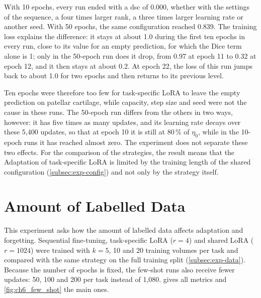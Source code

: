 With 10 epochs, every run ended with a \gls{dsc} of 0.000, whether with the settings of the sequence, a four times larger rank, a three times larger learning rate or another seed.
With 50 epochs, the same configuration reached 0.839.
The training loss explains the difference: it stays at about 1.0 during the first ten epochs in every run, close to its value for an empty prediction, for which the Dice term alone is 1; only in the 50-epoch run does it drop, from 0.97 at epoch 11 to 0.32 at epoch 12, and it then stays at about 0.2.
At epoch 22, the loss of this run jumps back to about 1.0 for two epochs and then returns to its previous level.

Ten epochs were therefore too few for task-specific LoRA to leave the empty prediction on patellar cartilage, while capacity, step size and seed were not the cause in these runs.
The 50-epoch run differs from the others in two ways, however: it has five times as many updates, and its learning rate decays over these 5{,}400 updates, so that at epoch 10 it is still at 80\,\% of $\eta_0$, while in the 10-epoch runs it has reached almost zero.
The experiment does not separate these two effects.
For the comparison of the strategies, the result means that the Adaptation of task-specific LoRA is limited by the training length of the shared configuration (\cref{subsec:exp-config}) and not only by the strategy itself.

\section{Amount of Labelled Data}
\label{sec:exp-few-shot}
This experiment asks how the amount of labelled data affects adaptation and forgetting.
Sequential fine-tuning, task-specific LoRA ($r = 4$) and shared LoRA ($r = 1024$) were trained with $k = 5$, 10 and 20 training volumes per task and compared with the same strategy on the full training split (\cref{subsec:exp-data}).
Because the number of epochs is fixed, the few-shot runs also receive fewer updates: 50, 100 and 200 per task instead of 1{,}080.
 gives all metrics and \cref{fig:ch6_few_shot} the main ones.

\begin{table}[tb]
\centering
\caption[Results of the few-shot experiment]{Results of the few-shot experiment (original task order). Volumes: training volumes per task; 108 is the full training split. Mean \gls{dsc}; $\uparrow$: higher is better, $\downarrow$: lower is better.}
\label{tab:ch6_few_shot}

\end{table}

